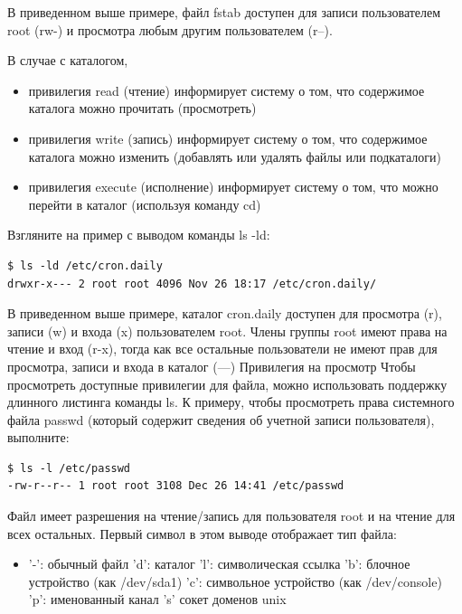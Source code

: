 \documentclass[10pt]{book}
\begin{document}
В приведенном выше примере, файл fstab доступен для записи пользователем root (rw-) и просмотра любым другим пользователем (r--).

В случае с каталогом,
\begin{itemize}
\item привилегия read (чтение) информирует систему о том, что содержимое  каталога можно прочитать (просмотреть)
\item привилегия write (запись) информирует систему о том, что содержимое каталога можно изменить (добавлять или удалять файлы или подкаталоги)
\item привилегия execute (исполнение) информирует систему о том, что можно перейти в каталог (используя команду cd)
\end{itemize}

Взгляните на пример с выводом команды ls -ld:

\vspace{3mm}
\begin{tcolorbox}
\begin{lstlisting}
$ ls -ld /etc/cron.daily
drwxr-x--- 2 root root 4096 Nov 26 18:17 /etc/cron.daily/                                                         
\end{lstlisting}
\end{tcolorbox}

В приведенном выше примере, каталог cron.daily доступен для просмотра (r), записи (w) и входа (x) пользователем root. Члены группы root имеют права на чтение и вход (r-x), тогда как все остальные пользователи не имеют прав для просмотра, записи и входа в каталог (---)
Привилегия на просмотр 
Чтобы просмотреть доступные привилегии для файла, можно использовать поддержку длинного листинга команды ls. К примеру, чтобы просмотреть права системного файла passwd (который содержит сведения об учетной записи пользователя), выполните:

\vspace{3mm}
\begin{tcolorbox}
\begin{lstlisting}
$ ls -l /etc/passwd
-rw-r--r-- 1 root root 3108 Dec 26 14:41 /etc/passwd
\end{lstlisting}
\end{tcolorbox}

Файл имеет разрешения на чтение/запись для пользователя root и на чтение для всех остальных. Первый символ в этом выводе отображает тип файла:

\begin{itemize}
\item 
'-': обычный файл 
'd': каталог 
'l': символическая ссылка 
'b': блочное устройство (как /dev/sda1)
'c': символьное устройство (как /dev/console)
'p': именованный канал
's' сокет доменов unix                        
\end{itemize}
\end{document}
